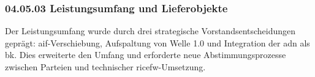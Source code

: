 \subsubsection*{04.05.03 Leistungsumfang und Lieferobjekte} 
\label{sec:04.05.03.LeistungsumfangUndLieferobjekte}

\par Der Leistungsumfang wurde durch drei strategische Vorstandsentscheidungen geprägt: \gls{aif}-Verschiebung, Aufspaltung von Welle 1.0 und Integration der \gls{adn} als \gls{bk}. Dies erweiterte den Umfang und erforderte neue Abstimmungsprozesse zwischen Parteien und technischer \gls{ricefw}-Umsetzung.